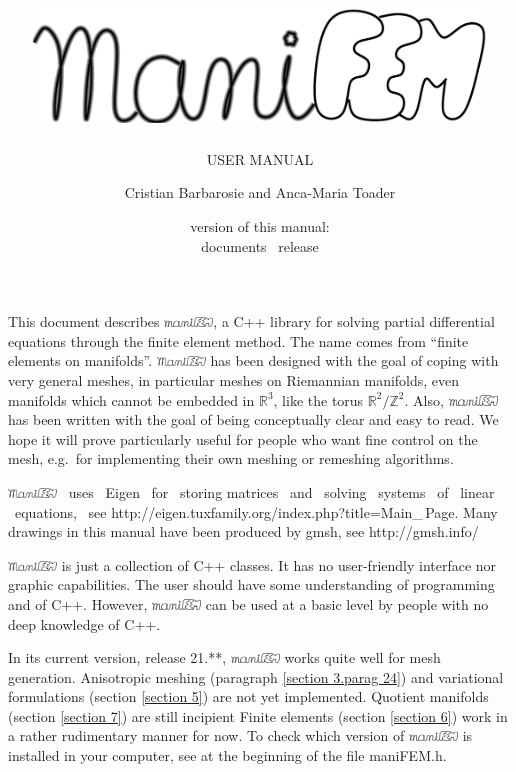 \documentclass[a4paper]{scrreprt}
\title{\includegraphics[width=12cm]{manifem-grey-capital.eps}}
\subtitle{USER MANUAL}
\author{Cristian Barbarosie and Anca-Maria Toader}
\date{\small version of this manual: \manualversion\\ documents \maniFEM\ release \manifemrelease}
\def\manifemrelease{21.**}
\def\numb{}
\newcommand\ManiFEM{\leavevmode\hbox{\includegraphics[width=13mm]{manifem-large}}}
\newcommand\maniFEM{\leavevmode\hbox{\includegraphics[width=13mm]{manifem-small}}}
\renewcommand\tt{\normalfont\ttfamily}
\begin{document}
\begin{titlepage}
\maketitle
\end{titlepage}


\chapter*{}

This document describes \maniFEM, a {\tt C++} library for solving partial differential equations
through the finite element method.
The name comes from ``finite elements on manifolds''. 
{\ManiFEM} has been designed with the goal of coping with very general meshes,
in particular meshes on Riemannian manifolds, even manifolds which cannot be embedded
in $ {\mathbb R}^3 $, like the torus $ {\mathbb R}^2/{\mathbb Z}^2 $.
Also, {\maniFEM} has been written with the goal of being conceptually clear
and easy to read.
We hope it will prove particularly useful for people who want fine control on the mesh,
e.g.\ for implementing their own meshing or remeshing algorithms.

{\ManiFEM} \ uses \ {\tt Eigen} \ for \ storing matrices \ and \ solving \ systems \ of
\ linear \ equations, \ see {\small\tt http://eigen.tuxfamily.org/index.php?title=Main\_\,Page}.
Many drawings in this manual have been produced by {\tt gmsh}, see
{\small\tt http://gmsh.info/}

{\ManiFEM} is just a collection of {\tt C++} classes.
It has no user-friendly interface nor graphic capabilities.
The user should have some understanding of programming and of {\tt C++}.
However, {\maniFEM} can be used at a basic level by people with no deep knowledge of
{\tt C++}.

In its current version, release \manifemrelease, {\maniFEM} works quite well for mesh generation.
Anisotropic meshing (paragraph \ref{\numb section 3.\numb parag 24}) and
variational formulations (section \ref{\numb section 5}) are not yet implemented.
Quotient manifolds (section \ref{\numb section 7}) are still incipient
Finite elements (section \ref{\numb section 6}) work in a rather rudimentary manner for now.
To check which version of {\maniFEM} is installed in your computer,
see at the beginning of the file {\small\tt maniFEM.h}.
\end{document}
